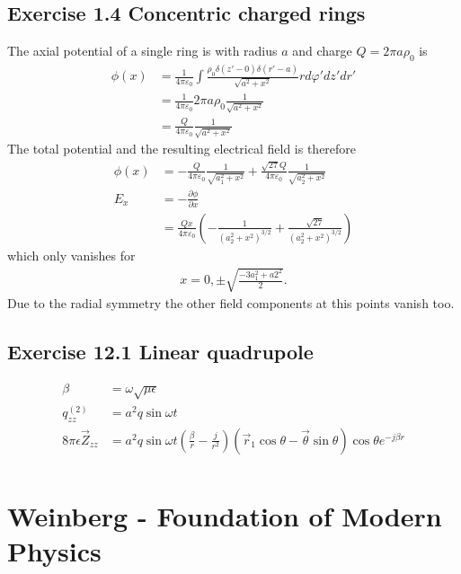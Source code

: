 \documentclass[10pt,a4paper]{book}
\theoremstyle{definition}
\begin{document}
\subsection{Exercise 1.4 Concentric charged rings}
The axial potential of a single ring is with radius $a$ and charge $Q=2\pi a\rho_0$ is
\begin{align}
    \phi(x)&=\frac{1}{4\pi\varepsilon_0}\int\frac{\rho_0\delta(z'-0)\delta(r'-a)}{\sqrt{a^2+x^2}}r d\varphi' dz' dr'\\
    &=\frac{1}{4\pi\varepsilon_0}2\pi a \rho_0\frac{1}{\sqrt{a^2+x^2}}\\
    &=\frac{Q}{4\pi\varepsilon_0}\frac{1}{\sqrt{a^2+x^2}}
\end{align}
The total potential and the resulting electrical field is therefore
\begin{align}
    \phi(x)&=-\frac{Q}{4\pi\varepsilon_0}\frac{1}{\sqrt{a_1^2+x^2}}+\frac{\sqrt{27}Q}{4\pi\varepsilon_0}\frac{1}{\sqrt{a_2^2+x^2}}\\
    E_x&=-\frac{\partial\phi}{\partial x}\\
    &=\frac{Qx}{4\pi\varepsilon_0}\left(-\frac{1}{(a_2^2+x^2)^{3/2}}+\frac{\sqrt{27}}{(a_2^2+x^2)^{3/2}}\right)
\end{align}
which only vanishes for
\begin{align}
    x=0,\pm\sqrt{\frac{-3a_1^2+a2^2}{2}}.
\end{align}
Due to the radial symmetry the other field components at this points vanish too.

\subsection{Exercise 12.1 Linear quadrupole}
\begin{align}
    \beta&=\omega\sqrt{\mu\epsilon}\\
    q_{zz}^{(2)}&=a^2q\sin\omega t\\
    8\pi\epsilon\vec{Z}_{zz}&=a^2q\sin\omega t\left(\frac{\beta}{r}-\frac{j}{r^2}\right)(\vec{r}_1\cos\theta-\vec{\theta}\sin\theta)\cos\theta e^{-j\beta r}\\
\end{align}

\section{{\sc Weinberg} - Foundation of Modern Physics}
\end{document}
